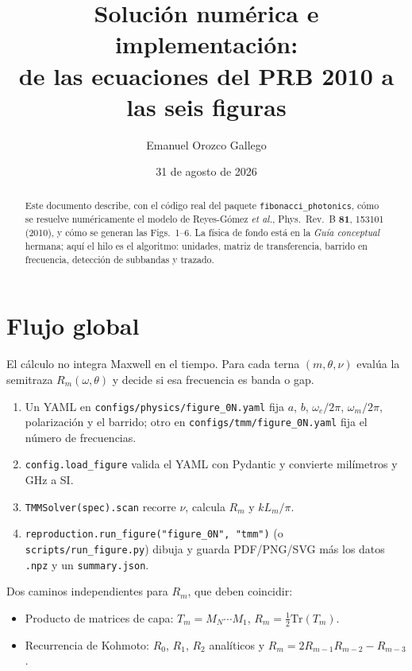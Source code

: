 \documentclass[11pt,a4paper]{article}
\title{Solución numérica e implementación:\\
de las ecuaciones del PRB 2010 a las seis figuras}
\author{Emanuel Orozco Gallego}
\date{31 de agosto de 2026}
\begin{document}
\maketitle

\begin{abstract}
Este documento describe, con el código real del paquete \texttt{fibonacci\_photonics},
cómo se resuelve numéricamente el modelo de Reyes-Gómez \textit{et al.},
Phys.\ Rev.\ B \textbf{81}, 153101 (2010), y cómo se generan las Figs.~1--6.
La física de fondo está en la \textit{Guía conceptual} hermana; aquí el hilo
es el algoritmo: unidades, matriz de transferencia, barrido en frecuencia,
detección de subbandas y trazado.
\end{abstract}

\tableofcontents
\newpage

\section{Flujo global}

El cálculo no integra Maxwell en el tiempo. Para cada terna
\((m,\theta,\nu)\) evalúa la semitraza \(R_m(\omega,\theta)\) y decide si
esa frecuencia es banda o gap.

\begin{enumerate}
\item Un YAML en \texttt{configs/physics/figure\_0N.yaml} fija \(a\), \(b\),
\(\omega_e/2\pi\), \(\omega_m/2\pi\), polarización y el barrido; otro en
\texttt{configs/tmm/figure\_0N.yaml} fija el número de frecuencias.
\item \texttt{config.load\_figure} valida el YAML con Pydantic y convierte milímetros y GHz a SI.
\item \texttt{TMMSolver(spec).scan} recorre \(\nu\), calcula \(R_m\) y
\(k L_m/\pi\).
\item \texttt{reproduction.run\_figure("figure\_0N", "tmm")} (o
\texttt{scripts/run\_figure.py}) dibuja y guarda PDF/PNG/SVG más los datos \texttt{.npz} y un \texttt{summary.json}.
\end{enumerate}

Dos caminos independientes para \(R_m\), que deben coincidir:

\begin{itemize}
\item Producto de matrices de capa: \(T_m=M_N\cdots M_1\),
\(R_m=\frac12\mathrm{Tr}(T_m)\).
\item Recurrencia de Kohmoto: \(R_0\), \(R_1\), \(R_2\) analíticos y
\(R_m=2R_{m-1}R_{m-2}-R_{m-3}\).
\end{itemize}
\end{document}
